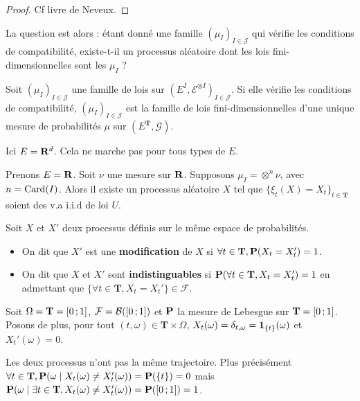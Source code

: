 	\begin{proof}
		Cf livre de Neveux.
	\end{proof}
	
	
	La question est alors : étant donné une famille $(\mu_I)_{I \in \mathcal{J}}$ qui vérifie les conditions de compatibilité, existe-t-il un processus aléatoire dont les lois fini-dimensionnelles sont les $\mu_I$ ?
	
	\begin{thm}
		Soit $(\mu_I)_{I \in \mathcal{J}}$ une famille de lois sur $\left( E^I, \mathcal{E}^{\otimes I} \right)_{I \in \mathcal{J}}$.
		Si elle vérifie les conditions de compatibilité, $(\mu_I)_{I \in \mathcal{J}}$ est la famille de lois fini-dimensionnelles d'une unique mesure de probabilités $\mu$ sur $\left( E^{\mathbf{T}}, \mathcal{G} \right)$.
	\end{thm}
	
	{\Large \noindent\lightning} Ici $E = \mathbf{R}^d$. Cela ne marche pas pour tous types de $E$.
	
	\begin{ex}
		Prenons $E = \mathbf{R}$.
		Soit $\nu$ une mesure sur $\mathbf{R}$.
		Supposons $\mu_I = \otimes^n \nu$, avec $n = \operatorname{Card}(I)$.
		Alors il existe un processus aléatoire $X$ tel que $\{ \xi_t(X) = X_t \}_{t \in \mathbf{T}}$ soient des v.a i.i.d de loi $U$.
	\end{ex}
	
	\begin{defn}
		Soit $X$ et $X'$ deux processus définis sur le même espace de probabilités.
		\begin{itemize}
			\item[\textbullet] On dit que $X'$ est une \textbf{modification} de $X$ si $\forall t \in \mathbf{T}, \mathbf{P}(X_t = X_t') = 1$.
			\item[\textbullet] On dit que $X$ et $X'$ sont \textbf{indistinguables} si $\mathbf{P}(\forall t \in \mathbf{T}, X_t = X_t') = 1$ en admettant que $\{ \forall t \in \mathbf{T}, X_t = X_t' \} \in \mathcal{F}$.
		\end{itemize}
	\end{defn}
	
	\begin{ex}
		Soit $\Omega = \mathbf{T} = \mathopen{[}0\mathclose{}\mathpunct{};1\mathclose{]}$, $\mathcal{F} = \mathcal{B}(\mathopen{[}0\mathclose{}\mathpunct{};1\mathclose{]})$ et $\mathbf{P}$ la mesure de Lebesgue sur $\mathbf{T} = \mathopen{[}0\mathclose{}\mathpunct{};1\mathclose{]}$. Posons de plus, pour tout $(t,\omega) \in \mathbf{T} \times \Omega$, $X_t(\omega) = \delta_{t,\omega} = \operatorname{\mathbf{1}}_{ \{ t \} }(\omega)$ et $X_t'(\omega) = 0$.
		
		Les deux processus n'ont pas la même trajectoire.
		Plus précisément $\forall t \in \mathbf{T}, \mathbf{P}( \omega \mid X_t(\omega) \neq X_t'(\omega) ) = \mathbf{P}( \{ t \} ) = 0$ mais $\mathbf{P}( \omega \mid \exists t \in \mathbf{T}, X_t(\omega) \neq X_t'(\omega) ) = \mathbf{P}(\mathopen{[}0\mathclose{}\mathpunct{};1\mathclose{]}) = 1$.
	\end{ex}
	
